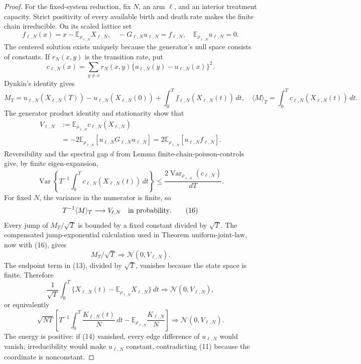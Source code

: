 \documentclass{article}
\begin{document}
\begin{proof}
For the fixed-system reduction, fix \(N\), an arm \(\ell\), and an interior treatment capacity.  Strict positivity of every available birth and death rate makes the finite chain irreducible.  On its scaled lattice set
\[
 f_{\ell,N}(x)=x-\mathbb E_{\rho_{\ell,N}}X_{\ell,N},
 \quad
 -G_{\ell,N}u_{\ell,N}=f_{\ell,N},
 \quad
 \mathbb E_{\rho_{\ell,N}}u_{\ell,N}=0.                     \tag{11}
\]
The centered solution exists uniquely because the generator's null space consists of constants.  If \(r_N(x,y)\) is the transition rate, put
\[
 c_{\ell,N}(x)=\sum_{y\ne x}r_N(x,y)
 \{u_{\ell,N}(y)-u_{\ell,N}(x)\}^2.                          \tag{12}
\]
Dynkin's identity gives
\[
 M_T=u_{\ell,N}(X_{\ell,N}(T))-u_{\ell,N}(X_{\ell,N}(0))
 +\int_0^Tf_{\ell,N}(X_{\ell,N}(t))\,dt,
 \quad
 \langle M\rangle_T=\int_0^Tc_{\ell,N}(X_{\ell,N}(t))\,dt. \tag{13}
\]
The generator product identity and stationarity show that
\[
 \begin{split}
 V_{\ell,N}
 &:=\mathbb E_{\rho_{\ell,N}}c_{\ell,N}(X_{\ell,N})\\
 &=-2\mathbb E_{\rho_{\ell,N}}
   [u_{\ell,N}G_{\ell,N}u_{\ell,N}]
 =2\mathbb E_{\rho_{\ell,N}}[u_{\ell,N}f_{\ell,N}].         \tag{14}
 \end{split}
\]
Reversibility and the spectral gap \(d\) from Lemma \(\mathrm{finite\mbox{-}chain\mbox{-}poisson\mbox{-}controls}\) give, by finite eigen-expansion,
\[
 \operatorname{Var}\!\left\{T^{-1}\int_0^T c_{\ell,N}(X_{\ell,N}(t))\,dt\right\}
 \leq\frac{2\operatorname{Var}_{\rho_{\ell,N}}(c_{\ell,N})}{dT}. \tag{15}
\]
For fixed \(N\), the variance in the numerator is finite, so
\[
 T^{-1}\langle M\rangle_T\longrightarrow V_{\ell,N}
 \quad\hbox{in probability}.                                  \tag{16}
\]
Every jump of \(M_T/\sqrt T\) is bounded by a fixed constant divided by \(\sqrt T\).  The compensated jump-exponential calculation used in Theorem \(\mathrm{uniform\mbox{-}joint\mbox{-}law}\), now with (16), gives
\[
 M_T/\sqrt T\Rightarrow\mathcal N(0,V_{\ell,N}).             \tag{17}
\]
The endpoint term in (13), divided by \(\sqrt T\), vanishes because the state space is finite.  Therefore
\[
 \frac1{\sqrt T}\int_0^T
 \{X_{\ell,N}(t)-\mathbb E_{\rho_{\ell,N}}X_{\ell,N}\}\,dt
 \Rightarrow\mathcal N(0,V_{\ell,N}),                        \tag{18}
\]
or equivalently
\[
 \sqrt{NT}\left[
 T^{-1}\int_0^T\frac{K_{\ell,N}(t)}N\,dt
 -\mathbb E_{\rho_{\ell,N}}\frac{K_{\ell,N}}N\right]
 \Rightarrow\mathcal N(0,V_{\ell,N}).                        \tag{19}
\]
The energy is positive: if (14) vanished, every edge difference of \(u_{\ell,N}\) would vanish; irreducibility would make \(u_{\ell,N}\) constant, contradicting (11) because the coordinate is nonconstant.


\end{proof}
\end{document}
